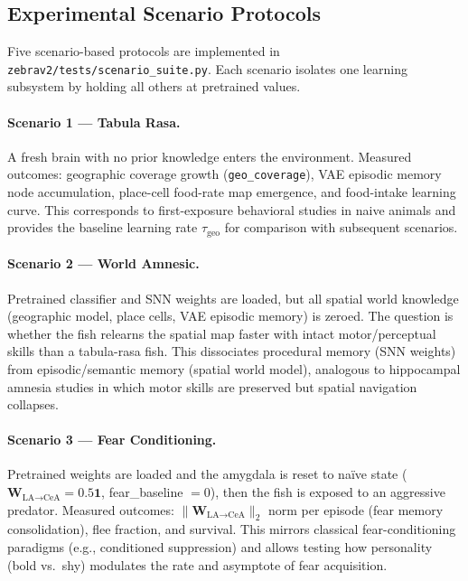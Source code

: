 \documentclass[12pt]{article}
\begin{document}
\subsection{Experimental Scenario Protocols}

\begin{sloppypar}
Five scenario-based protocols are implemented in
\texttt{zebrav2/tests/scenario\_suite.py}.
Each scenario isolates one learning subsystem by holding all others at
pretrained values.
\end{sloppypar}

\paragraph{Scenario 1 --- Tabula Rasa.}
A fresh brain with no prior knowledge enters the environment.
Measured outcomes: geographic coverage growth (\texttt{geo\_coverage}),
VAE episodic memory node accumulation, place-cell food-rate map emergence,
and food-intake learning curve.
This corresponds to first-exposure behavioral studies in naive animals
and provides the baseline learning rate $\tau_\text{geo}$ for comparison
with subsequent scenarios.

\paragraph{Scenario 2 --- World Amnesic.}
Pretrained classifier and SNN weights are loaded, but all spatial world
knowledge (geographic model, place cells, VAE episodic memory) is zeroed.
The question is whether the fish relearns the spatial map faster with intact
motor/perceptual skills than a tabula-rasa fish.
This dissociates procedural memory (SNN weights) from episodic/semantic
memory (spatial world model), analogous to hippocampal amnesia studies in
which motor skills are preserved but spatial navigation collapses.

\paragraph{Scenario 3 --- Fear Conditioning.}
Pretrained weights are loaded and the amygdala is reset to na\"{i}ve state
($\mathbf{W}_{\text{LA}\to\text{CeA}} = 0.5\mathbf{1}$, fear\_baseline $= 0$),
then the fish is exposed to an aggressive predator.
Measured outcomes: $\|\mathbf{W}_{\text{LA}\to\text{CeA}}\|_2$ norm per episode
(fear memory consolidation), flee fraction, and survival.
This mirrors classical fear-conditioning paradigms (e.g., conditioned
suppression) and allows testing how personality (bold vs.\ shy) modulates
the rate and asymptote of fear acquisition.
\end{document}
